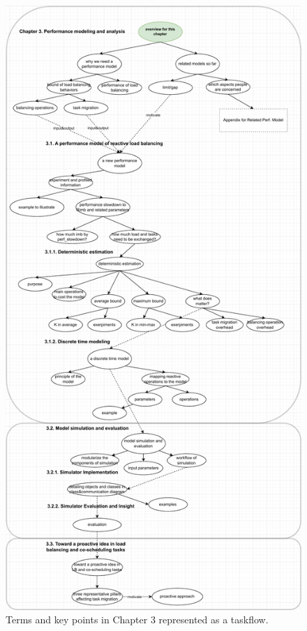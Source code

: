 \begin{figure}[t]
  \centering
  \includegraphics[scale=0.5]{./pictures/thesis_structure/taskflow_chapter3.pdf}
	\caption{Terms and key points in Chapter 3 represented as a taskflow.}
	\label{fig:thesistaskflow_chapter3}
\end{figure}


